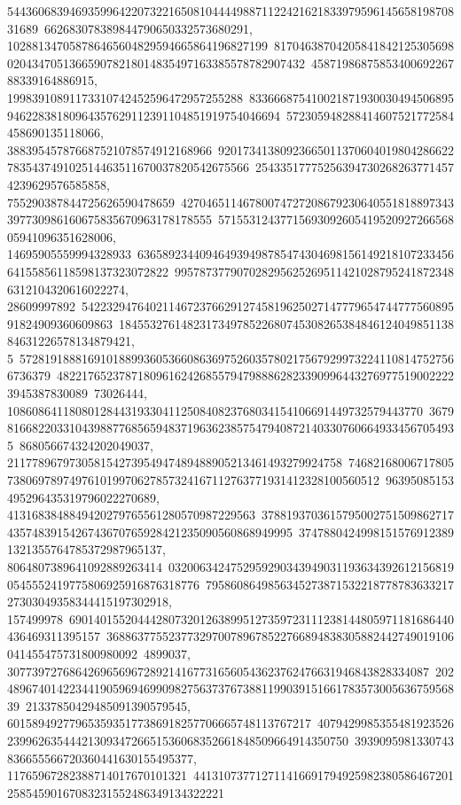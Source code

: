 {{{54436068394693599642207322165081044449887112242162183397959614565819870831689\
662683078389844790650332573680291, 102881347058786465604829594665864196827199\
81704638704205841842125305698020434705136659078218014835497163385578782907432\
4587198687585340069226788339164886915, 19983910891173310742452596472957255288\
83366687541002187193003049450689594622838180964357629112391104851919754046694\
572305948288414607521772584458690135118066, 388395457876687521078574912168966\
92017341380923665011370604019804286622783543749102514463511670037820542675566\
254335177752563947302682637714574239629576585858, 755290387844725626590478659\
42704651146780074727208679230640551818897343397730986160675835670963178178555\
5715531243771569309260541952092726656805941096351628006, 14695905559994328933\
63658923440946493949878547430469815614921810723345664155856118598137323072822\
9957873779070282956252695114210287952418723486312104320616022274, 28609997892\
54223294764021146723766291274581962502714777965474477756089591824909360609863\
18455327614823173497852268074530826538484612404985113884631226578134879421, 5\
57281918881691018899360536608636975260357802175679299732241108147527566736379\
48221765237871809616242685579479888628233909964432769775190022223945387830089\
73026444, 1086086411808012844319330411250840823768034154106691449732579443770\
36798166822033104398877685659483719636238575479408721403307606649334567054935\
868056674324202049037, 211778967973058154273954947489488905213461493279924758\
74682168006717805738069789749761019970627857324167112763771931412328100560512\
96395085153495296435319796022270689, 4131683848849420279765561280570987229563\
37881937036157950027515098627174357483915426743670765928421235090560868949995\
37478804249981515769123891321355764785372987965137, 8064807389641092889263414\
03200634247529592903439490311936343926121568190545552419775806925916876318776\
795860864985634527387153221877878363321727303049358344415197302918, 157499978\
69014015520444280732012638995127359723111238144805971181686440436469311395157\
36886377552377329700789678522766894838305882442749019106041455475731800980092\
4899037, 30773972768642696569672892141677316560543623762476631946843828334087\
20248967401422344190596946990982756373767388119903915166178357300563675956839\
21337850429485091390579545, 6015894927796535935177386918257706665748113767217\
40794299853554819235262399626354442130934726651536068352661848509664914350750\
3939095981330743836655566720360441630155495377, 11765967282388714017670101321\
44131073771271141669179492598238058646720125854590167083231552486349134322221\
}}}
